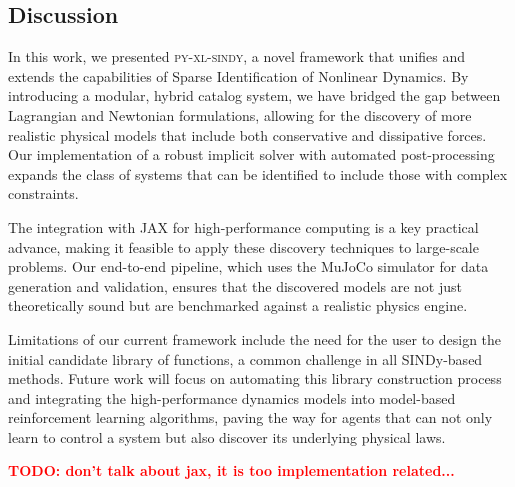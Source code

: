 \documentclass[12pt]{article}
\newcommand{\frameworkname}{\textsc{py-xl-sindy}}
\newcommand{\TODO}[1]{\textbf{\textcolor{red}{\Large TODO: \normalsize #1}}}
\begin{document}
\subsection*{Discussion}
In this work, we presented \frameworkname, a novel framework that unifies and extends the capabilities of Sparse Identification of Nonlinear Dynamics. By introducing a modular, hybrid catalog system, we have bridged the gap between Lagrangian and Newtonian formulations, allowing for the discovery of more realistic physical models that include both conservative and dissipative forces. Our implementation of a robust implicit solver with automated post-processing expands the class of systems that can be identified to include those with complex constraints.

The integration with JAX for high-performance computing is a key practical advance, making it feasible to apply these discovery techniques to large-scale problems. Our end-to-end pipeline, which uses the MuJoCo simulator for data generation and validation, ensures that the discovered models are not just theoretically sound but are benchmarked against a realistic physics engine.

Limitations of our current framework include the need for the user to design the initial candidate library of functions, a common challenge in all SINDy-based methods. Future work will focus on automating this library construction process and integrating the high-performance dynamics models into model-based reinforcement learning algorithms, paving the way for agents that can not only learn to control a system but also discover its underlying physical laws.

\TODO{don't talk about jax, it is too implementation related...}

\newpage

\end{document}
